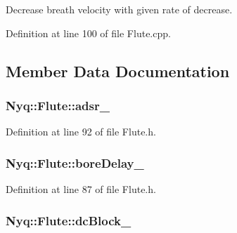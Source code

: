 Decrease breath velocity with given rate of decrease. 



Definition at line 100 of file Flute.\+cpp.



\subsection{Member Data Documentation}
\subsubsection[{\texorpdfstring{adsr\+\_\+}{adsr_}}]{ Nyq\+::\+Flute\+::adsr\+\_\+\hspace{0.3cm}{\ttfamily [protected]}}\hypertarget{class_nyq_1_1_flute_a1a88aeccb66942e59de52bfd249a4d1e}{}\label{class_nyq_1_1_flute_a1a88aeccb66942e59de52bfd249a4d1e}


Definition at line 92 of file Flute.\+h.

\subsubsection[{\texorpdfstring{bore\+Delay\+\_\+}{boreDelay_}}]{ Nyq\+::\+Flute\+::bore\+Delay\+\_\+\hspace{0.3cm}{\ttfamily [protected]}}\hypertarget{class_nyq_1_1_flute_aced0ab6f7ffe0774088513b44e7114e2}{}\label{class_nyq_1_1_flute_aced0ab6f7ffe0774088513b44e7114e2}


Definition at line 87 of file Flute.\+h.

\subsubsection[{\texorpdfstring{dc\+Block\+\_\+}{dcBlock_}}]{ Nyq\+::\+Flute\+::dc\+Block\+\_\+\hspace{0.3cm}{\ttfamily [protected]}}\hypertarget{class_nyq_1_1_flute_a2e549cf69c4b20f95cd8bfb37d8a5a7d}{}\label{class_nyq_1_1_flute_a2e549cf69c4b20f95cd8bfb37d8a5a7d}


